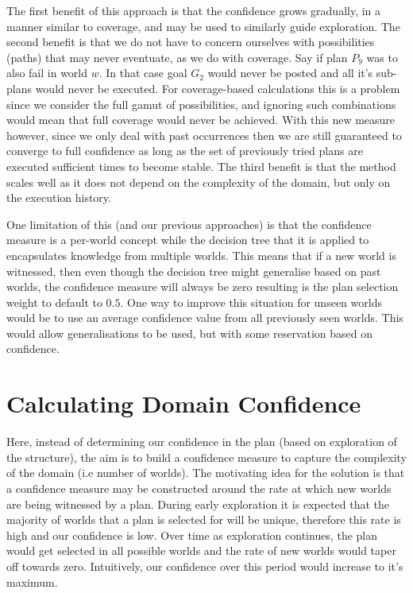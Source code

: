 \documentclass[a4paper]{article}
\begin{document}
The first benefit of this approach is that the confidence grows gradually, in a manner similar to coverage, and may be used to similarly guide exploration. The second benefit is that we do not have to concern ourselves with possibilities (paths) that may never eventuate, as we do with coverage. Say if plan $P_9$ was to also fail in world $w$. In that case goal $G_2$ would never be posted and all it's sub-plans would never be executed. For coverage-based calculations this is a problem since we consider the full gamut of possibilities, and ignoring such combinations would mean that full coverage would never be achieved. With this new measure however, since we only deal with past occurrences then we are still guaranteed to converge to full confidence as long as the set of previously tried plans are executed sufficient times to become stable. The third benefit is that the method scales well as it does not depend on the complexity of the domain, but only on the execution history.

One limitation of this (and our previous approaches) is that the confidence measure is a per-world concept while the decision tree that it is applied to encapsulates knowledge from multiple worlds. This means that if a new world is witnessed, then even though the decision tree might generalise based on past worlds, the confidence measure will always be zero resulting is the plan selection weight to default to $0.5$. One way to improve this situation for unseen worlds would be to use an average confidence value from all previously seen worlds. This would allow generalisations to be used, but with some reservation based on confidence.


\section{Calculating Domain Confidence}

Here, instead of determining our confidence in the plan (based on exploration of the structure), the aim is to build a confidence measure to capture the complexity of the domain (i.e number of worlds). The motivating idea for the solution is that a confidence measure may be constructed around the rate at which new worlds are being witnessed by a plan. During early exploration it is expected that the majority of worlds that a plan is selected for will be unique, therefore this rate is high and our confidence is low. Over time as exploration continues, the plan would get selected in all possible worlds and the rate of new worlds would taper off towards zero. Intuitively, our confidence over this period would increase to it's maximum. 
\end{document}
